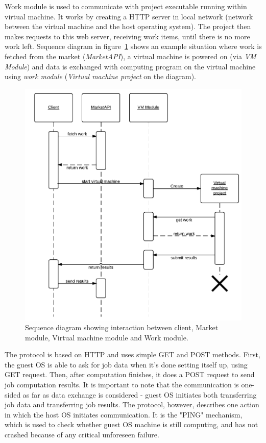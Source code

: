 Work module is used to communicate with project executable running within virtual machine. It works by creating a HTTP server in local network (network between the virtual machine and the host operating system). The project then makes requests to this web server, receiving work items, until there is no more work left. Sequence diagram in figure~\ref{f:clientseq} shows an example situation where work is fetched from the market (\emph{MarketAPI}), a virtual machine is powered on (via \emph{VM Module}) and data is exchanged with computing program on the virtual machine using \emph{work module} (\emph{Virtual machine project} on the diagram).

\begin{figure}
\centering
\includegraphics{diagrams/ClientSequence.pdf}
\caption{Sequence diagram showing interaction between client, Market module, Virtual machine module and Work module.}
\label{f:clientseq}
\end{figure}

The protocol is based on HTTP and uses simple GET and POST methods. First, the guest OS is able to ask for job data when it's done setting itself up, using GET request. Then, after computation finishes, it does a POST request to send job computation results. It is important to note that the communication is one-sided as far as data exchange is considered - guest OS initiates both transferring job data and transferring job results. The protocol, however, describes one action in which the host OS initiates communication. It is the "PING" mechanism, which is used to check whether guest OS machine is still computing, and has not crashed because of any critical unforeseen failure. 

